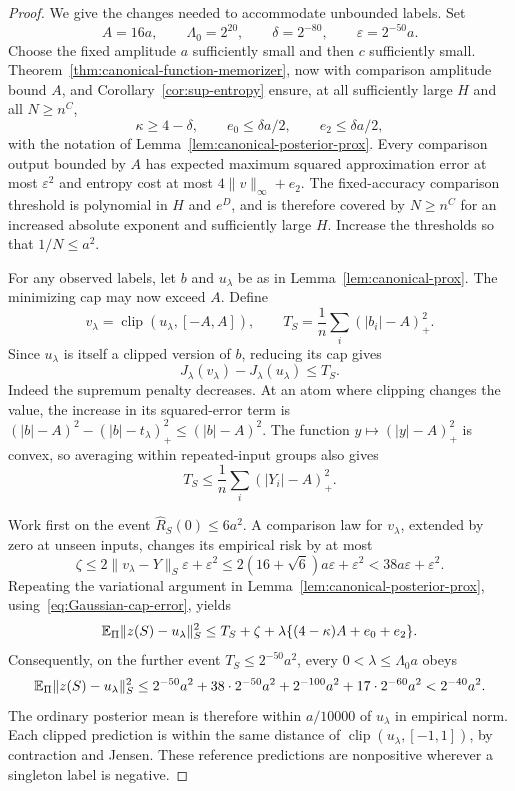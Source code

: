 \begin{proof}
We give the changes needed to accommodate unbounded labels. Set
\[
 A=16a,\qquad \Lambda_0=2^{20},\qquad
 \delta=2^{-80},\qquad \varepsilon=2^{-50}a.
\]
Choose the fixed amplitude $a$ sufficiently small and then $c$ sufficiently small. Theorem~\ref{thm:canonical-function-memorizer}, now with comparison amplitude bound $A$, and Corollary~\ref{cor:sup-entropy} ensure, at all sufficiently large $H$ and all $N\ge n^C$,
\[
 \kappa\ge4-\delta,\qquad e_0\le\delta a/2,
 \qquad e_2\le\delta a/2,
\]
with the notation of Lemma~\ref{lem:canonical-posterior-prox}. Every comparison output bounded by $A$ has expected maximum squared approximation error at most $\varepsilon^2$ and entropy cost at most $4\|v\|_\infty+e_2$. The fixed-accuracy comparison threshold is polynomial in $H$ and $e^D$, and is therefore covered by $N\ge n^C$ for an increased absolute exponent and sufficiently large $H$. Increase the thresholds so that $1/N\le a^2$.

For any observed labels, let $b$ and $u_\lambda$ be as in Lemma~\ref{lem:canonical-prox}. The minimizing cap may now exceed $A$. Define
\[
 v_\lambda=\operatorname{clip}(u_\lambda,[-A,A]),\qquad
 T_S=\frac1n\sum_i(|b_i|-A)_+^2.
\]
Since $u_\lambda$ is itself a clipped version of $b$, reducing its cap gives
\begin{equation}
 J_\lambda(v_\lambda)-J_\lambda(u_\lambda)\le T_S.
 \label{eq:Gaussian-cap-error}
\end{equation}
Indeed the supremum penalty decreases. At an atom where clipping changes the value, the increase in its squared-error term is
$(|b|-A)^2-(|b|-t_\lambda)_+^2\le(|b|-A)^2$.
The function $y\mapsto(|y|-A)_+^2$ is convex, so averaging within repeated-input groups also gives
\[
 T_S\le\frac1n\sum_i(|Y_i|-A)_+^2.
\]

Work first on the event $\widehat R_S(0)\le6a^2$. A comparison law for $v_\lambda$, extended by zero at unseen inputs, changes its empirical risk by at most
\[
 \zeta\le2\|v_\lambda-Y\|_S\varepsilon+\varepsilon^2
 \le2(16+\sqrt6)a\varepsilon+\varepsilon^2
 <38a\varepsilon+\varepsilon^2.
\]
Repeating the variational argument in Lemma~\ref{lem:canonical-posterior-prox}, using~\eqref{eq:Gaussian-cap-error}, yields
\[
 \mathbb E_\Pi\|z(S)-u_\lambda\|_S^2
 \le T_S+\zeta+\lambda\{(4-\kappa)A+e_0+e_2\}.
\]
Consequently, on the further event $T_S\le2^{-50}a^2$, every
$0<\lambda\le\Lambda_0a$ obeys
\[
 \mathbb E_\Pi\|z(S)-u_\lambda\|_S^2
 \le2^{-50}a^2+38\cdot2^{-50}a^2+2^{-100}a^2
            +17\cdot2^{-60}a^2
 <2^{-40}a^2.
\]
The ordinary posterior mean is therefore within $a/10000$ of $u_\lambda$ in empirical norm. Each clipped prediction is within the same distance of $\operatorname{clip}(u_\lambda,[-1,1])$, by contraction and Jensen. These reference predictions are nonpositive wherever a singleton label is negative.


\end{proof}
